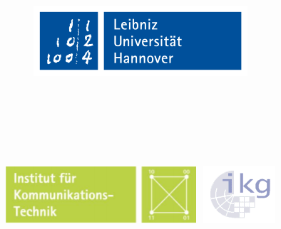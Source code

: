 



\title{
    \vspace{-1cm}
    \includegraphics[scale=0.8]{images/leibniz.png}\\
	\vspace{1cm}
	\Large{\documentinstitute}
	\vspace{1cm}
	\Large{\documenttype}
	\vspace{0.4cm}\\
	\huge{\textbf{\documenttitle}}
	\vspace{1.0cm}\\
	\Large\textbf{\documentauthor}
	\vspace{1cm}\\
	\documenttutor
	\vspace{2cm}
	\includegraphics[scale=0.8]{images/IKT.png}\hspace{1cm}
	\includegraphics[scale=0.6]{images/IKG.png}\\
	\vspace{-1cm}
}



